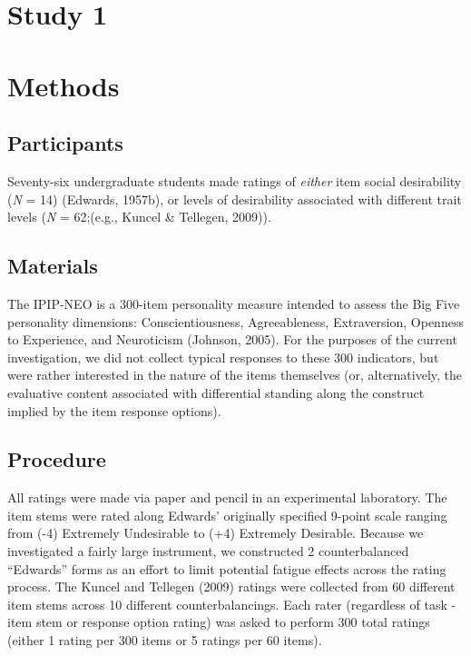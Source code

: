 \documentclass[
  english,
  ,jou]{apa6}
\begin{document}
\hypertarget{study-1}{%
\section{Study 1}\label{study-1}}

\hypertarget{methods}{%
\section{Methods}\label{methods}}

\hypertarget{participants}{%
\subsection{Participants}\label{participants}}

Seventy-six undergraduate students made ratings of \emph{either} item social desirability (\emph{N} = 14) (Edwards, 1957b), or levels of desirability associated with different trait levels (\emph{N} = 62;(e.g., Kuncel \& Tellegen, 2009)).

\hypertarget{materials}{%
\subsection{Materials}\label{materials}}

The IPIP-NEO is a 300-item personality measure intended to assess the Big Five personality dimensions: Conscientiousness, Agreeableness, Extraversion, Openness to Experience, and Neuroticism (Johnson, 2005). For the purposes of the current investigation, we did not collect typical responses to these 300 indicators, but were rather interested in the nature of the items themselves (or, alternatively, the evaluative content associated with differential standing along the construct implied by the item response options).

\hypertarget{procedure}{%
\subsection{Procedure}\label{procedure}}

All ratings were made via paper and pencil in an experimental laboratory. The item stems were rated along Edwards' originally specified 9-point scale ranging from (-4) Extremely Undesirable to (+4) Extremely Desirable. Because we investigated a fairly large instrument, we constructed 2 counterbalanced \enquote{Edwards} forms as an effort to limit potential fatigue effects across the rating process. The Kuncel and Tellegen (2009) ratings were collected from 60 different item stems across 10 different counterbalancings. Each rater (regardless of task - item stem or response option rating) was asked to perform 300 total ratings (either 1 rating per 300 items or 5 ratings per 60 items).
\end{document}
